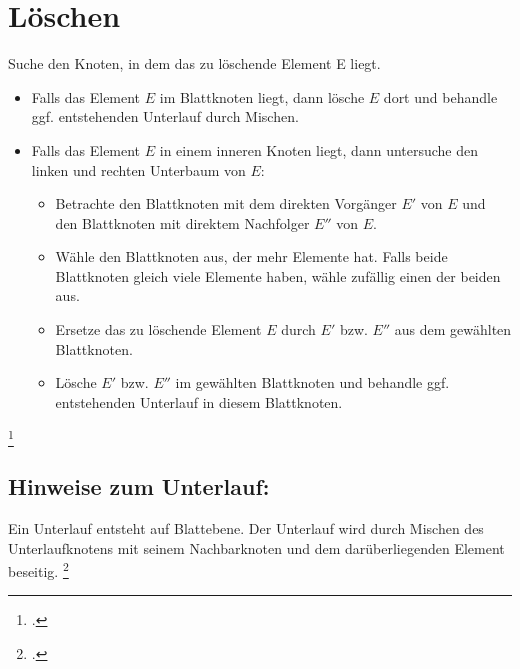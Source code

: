 \documentclass{lehramt-informatik-haupt}
\begin{document}
\section{Löschen}

Suche den Knoten, in dem das zu löschende Element E liegt.

\begin{itemize}
\item Falls das Element $E$ im Blattknoten liegt, dann lösche $E$ dort
und behandle ggf. entstehenden Unterlauf durch Mischen.

\item Falls das Element $E$ in einem inneren Knoten liegt, dann
untersuche den linken und rechten Unterbaum von $E$:

\begin{itemize}
\item Betrachte den Blattknoten mit dem direkten Vorgänger $E'$ von $E$
und den Blattknoten mit direktem Nachfolger $E''$ von $E$.

\item Wähle den Blattknoten aus, der mehr Elemente hat. Falls beide
Blattknoten gleich viele Elemente haben, wähle zufällig einen der beiden
aus.

\item Ersetze das zu löschende Element $E$ durch $E'$ bzw. $E''$ aus dem
gewählten Blattknoten.

\item Lösche $E'$ bzw. $E''$ im gewählten Blattknoten und behandle ggf.
entstehenden Unterlauf in diesem Blattknoten.
\end{itemize}
\end{itemize}

\footcite[Seite 39 (PDF 32)]{aud:fs:5}

\subsection{Hinweise zum Unterlauf:}

Ein Unterlauf entsteht auf Blattebene. Der Unterlauf wird durch Mischen
des Unterlaufknotens mit seinem Nachbarknoten und dem darüberliegenden
Element beseitig.
\footcite[Seite 40 (PDF 33)]{aud:fs:5}

\literatur
\end{document}

